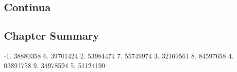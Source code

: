 \subsection{Continua}
\label{sub:continua}

\subsection{Chapter Summary}
\label{sub:backSum}
-1. 38880358	6. 39701424
2. 53984474	7. 55749974
3. 32169561	8. 84597658
4. 03891758	9. 34978594
5. 51124190	 
